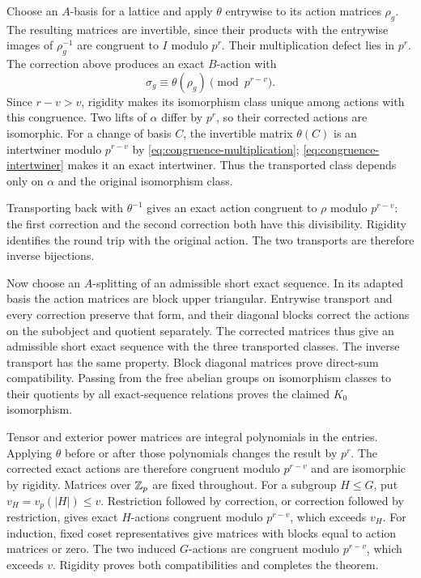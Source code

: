 Choose an $A$-basis for a lattice and apply $\theta$ entrywise to
its action matrices $\rho_g$.  The resulting matrices are
invertible, since their products with the entrywise images of
$\rho_g^{-1}$ are congruent to $I$ modulo $p^r$.
Their multiplication defect lies in $p^r$.  The correction above
produces an exact $B$-action with
\[
 \sigma_g\equiv\theta(\rho_g)\pmod {p^{r-v}}.
\]
Since $r-v>v$, rigidity makes its isomorphism class unique among
actions with this congruence.  Two lifts of $\alpha$ differ by
$p^r$, so their corrected actions are isomorphic.  For a change
of basis $C$, the invertible matrix $\theta(C)$ is an intertwiner
modulo $p^{r-v}$ by \eqref{eq:congruence-multiplication};
\eqref{eq:congruence-intertwiner} makes it an exact intertwiner.
Thus the transported class depends only on $\alpha$ and the
original isomorphism class.

Transporting back with $\theta^{-1}$ gives an exact action
congruent to $\rho$ modulo $p^{r-v}$: the first correction and the
second correction both have this divisibility.  Rigidity identifies
the round trip with the original action.  The two transports are
therefore inverse bijections.

Now choose an $A$-splitting of an admissible short exact sequence.
In its adapted basis the action matrices are block upper triangular.
Entrywise transport and every correction preserve that form, and
their diagonal blocks correct the actions on the subobject and
quotient separately.  The corrected matrices thus give an admissible
short exact sequence with the three transported classes.
The inverse transport has the same property.  Block diagonal
matrices prove direct-sum compatibility.  Passing from the free
abelian groups on isomorphism classes to their quotients by all
exact-sequence relations proves the claimed $K_0$ isomorphism.

Tensor and exterior power matrices are integral polynomials in
the entries.  Applying $\theta$ before or after those polynomials
changes the result by $p^r$.  The corrected exact actions are
therefore congruent modulo $p^{r-v}$ and are isomorphic by rigidity.
Matrices over $\mathbb Z_p$ are fixed throughout.  For a subgroup
$H\le G$, put $v_H=v_p(|H|)\le v$.  Restriction followed by
correction, or correction followed by restriction, gives exact
$H$-actions congruent modulo $p^{r-v}$, which exceeds $v_H$.
For induction, fixed coset representatives give matrices with blocks
equal to action matrices or zero.  The two induced $G$-actions are
congruent modulo $p^{r-v}$, which exceeds $v$.
Rigidity proves both compatibilities and completes the theorem.

